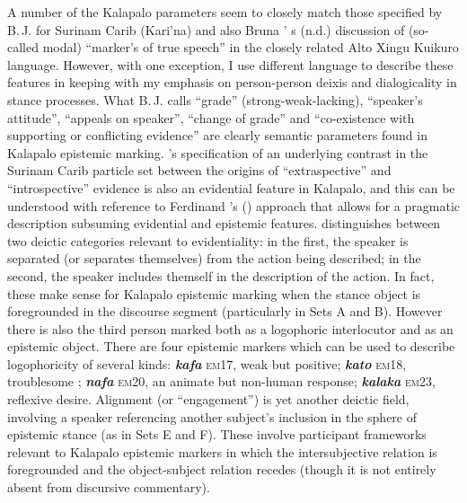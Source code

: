 \documentclass[output=paper]{langsci/langscibook}
\begin{document}
 
A number of the Kalapalo parameters seem to closely match those specified by B.\,J. \cite{Hoff1986} for Surinam Carib (Kari’na) and also Bruna \citeauthor{Franchetto}’ s (n.d.) discussion of  (so-called modal) ``marker’s of true speech'' in the closely related Alto Xingu Kuikuro language.  However, with one exception, I use different language to describe these features in keeping with my emphasis on person-person deixis and dialogicality in stance processes.  What B.\,J. \citeauthor{Hoff1986} calls “grade” (strong-weak-lacking), “speaker’s attitude”, “appeals on speaker”, “change of grade” and “co-existence with supporting or conflicting evidence” are clearly semantic parameters found in Kalapalo epistemic marking.  \citeauthor{Hoff1986}’s specification of an underlying contrast in the Surinam Carib particle set between the origins of “extraspective” and  “introspective” evidence  is also an evidential feature in Kalapalo, and this can be understood with reference to Ferdinand \citeauthor{Haan2001}’s (\citeyear{Haan2001}) approach that allows for a pragmatic description subsuming evidential and epistemic features.  \citeauthor{Haan2001} distinguishes between two deictic categories relevant to evidentiality: in the first, the speaker is separated (or separates themselves) from the action being described; in the second, the speaker includes themself in the description of the action.
 In fact, these make sense for Kalapalo epistemic marking when the stance object is foregrounded in the discourse segment  (particularly in Sets A and B). 
However there is also the third person marked both as a logophoric interlocutor and as an epistemic object.  There are four epistemic markers which can be used to describe logophoricity of several kinds: \textbf{\textit{kafa}} \textsc{em}17, weak but positive; \textbf{\textit{kato}} \textsc{em}18, troublesome ; \textbf{\textit{nafa}} \textsc{em}20, an animate but non-human response; \textbf{\textit{kalaka}} \textsc{em}23, reflexive desire.  Alignment (or ``engagement'') is yet another deictic field,   involving a speaker referencing another subject’s inclusion in the sphere of epistemic stance (as in Sets E and F).
These involve participant frameworks relevant to Kalapalo epistemic markers in which the intersubjective relation is foregrounded and the object-subject relation recedes (though it is not entirely absent from discursive commentary). 
\end{document}
